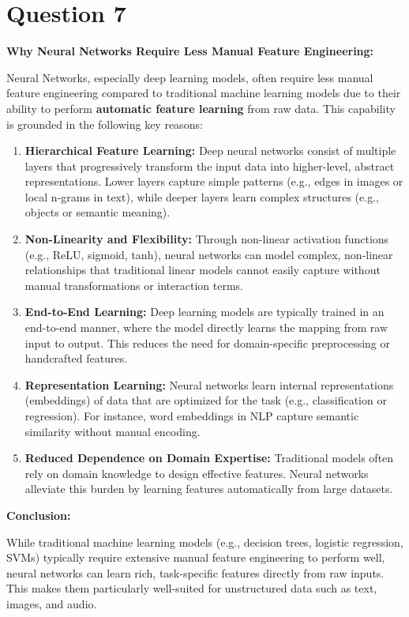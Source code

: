 \documentclass[a4paper,12pt]{article}
\begin{document}
\section*{Question 7}
\noindent\textbf{Why Neural Networks Require Less Manual Feature Engineering:}

Neural Networks, especially deep learning models, often require less manual feature engineering compared to traditional machine learning models due to their ability to perform \textbf{automatic feature learning} from raw data. This capability is grounded in the following key reasons:

\begin{enumerate}
    \item \textbf{Hierarchical Feature Learning:} Deep neural networks consist of multiple layers that progressively transform the input data into higher-level, abstract representations. Lower layers capture simple patterns (e.g., edges in images or local n-grams in text), while deeper layers learn complex structures (e.g., objects or semantic meaning).

    \item \textbf{Non-Linearity and Flexibility:} Through non-linear activation functions (e.g., ReLU, sigmoid, tanh), neural networks can model complex, non-linear relationships that traditional linear models cannot easily capture without manual transformations or interaction terms.

    \item \textbf{End-to-End Learning:} Deep learning models are typically trained in an end-to-end manner, where the model directly learns the mapping from raw input to output. This reduces the need for domain-specific preprocessing or handcrafted features.

    \item \textbf{Representation Learning:} Neural networks learn internal representations (embeddings) of data that are optimized for the task (e.g., classification or regression). For instance, word embeddings in NLP capture semantic similarity without manual encoding.

    \item \textbf{Reduced Dependence on Domain Expertise:} Traditional models often rely on domain knowledge to design effective features. Neural networks alleviate this burden by learning features automatically from large datasets.

\end{enumerate}

\noindent\textbf{Conclusion:}

While traditional machine learning models (e.g., decision trees, logistic regression, SVMs) typically require extensive manual feature engineering to perform well, neural networks can learn rich, task-specific features directly from raw inputs. This makes them particularly well-suited for unstructured data such as text, images, and audio.
\end{document}

